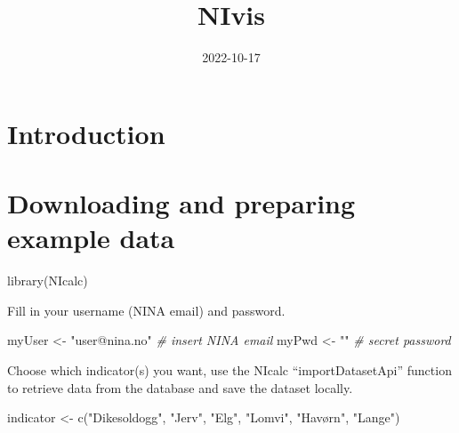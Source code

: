 \documentclass[
]{book}
\title{NIvis}
\author{}
\date{\vspace{-2.5em}2022-10-17}
\newenvironment{Shaded}{\begin{snugshade}}{\end{snugshade}}
\newcommand{\CommentTok}[1]{\textcolor[rgb]{0.56,0.35,0.01}{\textit{#1}}}
\newcommand{\FunctionTok}[1]{\textcolor[rgb]{0.00,0.00,0.00}{#1}}
\newcommand{\NormalTok}[1]{#1}
\newcommand{\OtherTok}[1]{\textcolor[rgb]{0.56,0.35,0.01}{#1}}
\newcommand{\StringTok}[1]{\textcolor[rgb]{0.31,0.60,0.02}{#1}}
\begin{document}
\maketitle

{
\setcounter{tocdepth}{1}
\tableofcontents
}
\hypertarget{introduction}{%
\chapter{Introduction}\label{introduction}}

\hypertarget{downloading-and-preparing-example-data}{%
\chapter{Downloading and preparing example data}\label{downloading-and-preparing-example-data}}

\begin{Shaded}
\begin{Highlighting}[]
\FunctionTok{library}\NormalTok{(NIcalc)}
\end{Highlighting}
\end{Shaded}

Fill in your username (NINA email) and password.

\begin{Shaded}
\begin{Highlighting}[]

\NormalTok{myUser }\OtherTok{\textless{}{-}} \StringTok{"user@nina.no"} \CommentTok{\# insert NINA email}
\NormalTok{myPwd  }\OtherTok{\textless{}{-}} \StringTok{""} \CommentTok{\# secret password}
\end{Highlighting}
\end{Shaded}

Choose which indicator(s) you want, use the NIcalc ``importDatasetApi'' function to retrieve data from the database and save the dataset locally.

\begin{Shaded}
\begin{Highlighting}[]
\NormalTok{indicator }\OtherTok{\textless{}{-}} \FunctionTok{c}\NormalTok{(}\StringTok{"Dikesoldogg"}\NormalTok{,}
               \StringTok{"Jerv"}\NormalTok{,}
               \StringTok{"Elg"}\NormalTok{,}
               \StringTok{"Lomvi"}\NormalTok{,}
               \StringTok{"Havørn"}\NormalTok{,}
               \StringTok{"Lange"}\NormalTok{)}
\end{Highlighting}
\end{Shaded}
\end{document}
